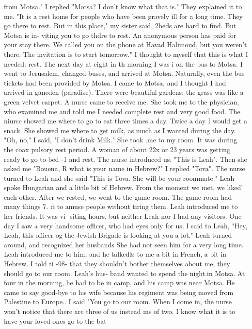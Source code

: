 {from Motsa." I replied "Motsa? I don't know what that is." They explained it to me. 
"It is a rest home for people who have been gravely ill for a long time. They go there 
to rest. But in this place," my sister said, 2beds are hard to find. But Motsa is in-
viting you to go thdre to rest. An anonymous person has paid for your stay there. We 
called you on the phone at Havad Halimoud, but you weren't there. The invitation is to 
start tomorrow." 
I thought to myself that this is what I needed: rest. The next day at eight in th 
morning I was i on the bus to Motsa. I went to Jerusalem, changed buses, and arrived at 
Motsa. Naturally, even the bus tickets had been provided by Motsa. I came to Motsa, 
and I thought I had arrived in ganeden (paradise). There were beautiful gardens; the 
grass was like a green velvet carpet. A nurse came to receive me. She took me to the 
physician, who examined me and told me I needed complete rest and very good food. 
The niurse showed me where to go to eat three times a day. Twice a day I would 
get a snack. She showed me where to get milk, as much as I wanted during the day. 
"Oh, no," I said, "I don't drink Milk." She took .me to my room. It was during the coax{ 
pulsory rest period. A woman of about 22x or 23 years was getting ready to go to bed -1 
and rest. The nurse introduced us. "This is Leah". Then she asked me "Bouena, R what 
is your name in Hebrew?" I replied "Tova". The nurse turned to Leah and she said 
"This is Tova. She will be your roommate." 
Leah spoke Hungarian and a little bit of Hebrew. From the moment we met, we liked' 
each other. After we rested, we went to the game room. The game room had many things 7. 
it to amuse people without tiring them. Leah introduced me to her friends. It was vi-
siting hours, but neither Leah nor I had any visitors. 
One day I saw a very handsome officer, who had eyes only for us. I said to Leah, 
"Hey, Leah, this officer og the Jewish Brigade is looking at you a lot." Leah turned 
around, and recognized her husbands She had not seen him for a very long time. Leah 
introduced me to him, and he talked& to me a bit in French, a bit in Hebrew. I told ti 
-98- 
that they shouldn't bother themselves about me, they should go to our room. Leah's hus-
band wanted to spend the night.in Motsa. At four in the morning, he had to be in camp, 
and his camp was near Motsa. He came to say good-bye to his wife because his regiment 
was being moved from Palestine to Europe.. 
I said "You go to our room. When I come in, the nurse won't notice that there are 
three of us instead ms of two. I know what it is to have your loved ones go to the bat-
}}
